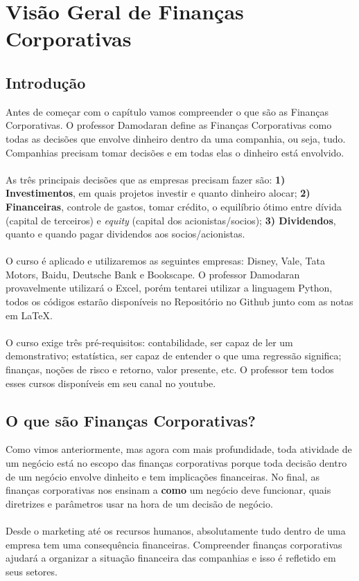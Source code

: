 \chapter{Visão Geral de Finanças Corporativas}
\section*{Introdução}
Antes de começar com o capítulo vamos compreender o que são as Finanças Corporativas. O professor Damodaran define as Finanças Corporativas como todas as decisões que envolve dinheiro dentro da uma companhia, ou seja, tudo. Companhias precisam tomar decisões e em todas elas o dinheiro está envolvido.
\\~\\
As três principais decisões que as empresas precisam fazer são: \textbf{1) Investimentos}, em quais projetos investir e quanto dinheiro alocar; \textbf{2) Financeiras}, controle de gastos, tomar crédito, o equilíbrio ótimo entre dívida (capital de terceiros) e \textit{equity} (capital dos acionistas/socios); \textbf{3) Dividendos}, quanto e quando pagar dividendos aos socios/acionistas.
\\~\\
O curso é aplicado e utilizaremos as seguintes empresas: Disney, Vale, Tata Motors, Baidu, Deutsche Bank e Bookscape. O professor Damodaran provavelmente utilizará o Excel, porém tentarei utilizar a linguagem Python, todos os códigos estarão disponíveis no Repositório no Github junto com as notas em \LaTeX.
\\~\\
O curso exige três pré-requisitos: contabilidade, ser capaz de ler um demonstrativo; estatística, ser capaz de entender o que uma regressão significa; finanças, noções de risco e retorno, valor presente, etc. O professor tem todos esses cursos disponíveis em seu canal no youtube.

\section{O que são Finanças Corporativas?}
Como vimos anteriormente, mas agora com mais profundidade, toda atividade de um negócio está no escopo das finanças corporativas porque toda decisão dentro de um negócio envolve dinheito e tem implicações financeiras. No final, as finanças corporativas nos ensinam a \textbf{como} um negócio deve funcionar, quais diretrizes e parâmetros usar na hora de um decisão de negócio.
\\~\\
Desde o marketing até os recursos humanos, absolutamente tudo dentro de uma empresa tem uma consequência financeiras. Compreender finanças corporativas ajudará a organizar a situação financeira das companhias e isso é refletido em seus setores.

